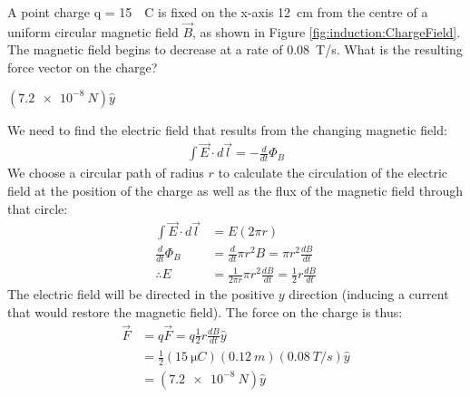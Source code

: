 \question A point charge q = \SI{15}{\mu C} is fixed on the x-axis \SI{12}{cm} from the centre of a uniform circular magnetic field $\vec{B}$, as shown in Figure \ref{fig:induction:ChargeField}. The magnetic field begins to decrease at a rate of \SI{0.08}{T/s}. What is the resulting force vector on the charge?
\begin{finalanswer}
$(\SI{7.2e-8}{N})\hat y$
\end{finalanswer}
\begin{solution}
We need to find the electric field that results from the changing magnetic field:
\begin{align*}
\int \vec E\cdot d\vec l=-\frac{d}{dt}\Phi_B
\end{align*}
We choose a circular path of radius $r$ to calculate the circulation of the electric field at the position of the charge as well as the flux of the magnetic field through that circle:
\begin{align*}
\int \vec E\cdot d\vec l&=E(2\pi r)\\
\frac{d}{dt}\Phi_B&=\frac{d}{dt}\pi r ^2 B=\pi r^2 \frac{dB}{dt}\\
\therefore E&=\frac{1}{2\pi r}\pi r^2 \frac{dB}{dt}=\frac{1}{2}r\frac{dB}{dt}
\end{align*}
The electric field will be directed in the positive $y$ direction (inducing a current that would restore the magnetic field). The force on the charge is thus:
\begin{align*}
\vec F&=q\vec F=q\frac{1}{2}r\frac{dB}{dt}\hat y\\
&=\frac{1}{2}(\SI{15}{\micro C})(\SI{0.12}{m})(\SI{0.08}{T/s})\hat y\\
&=(\SI{7.2e-8}{N}) \hat y
\end{align*}
\end{solution}


